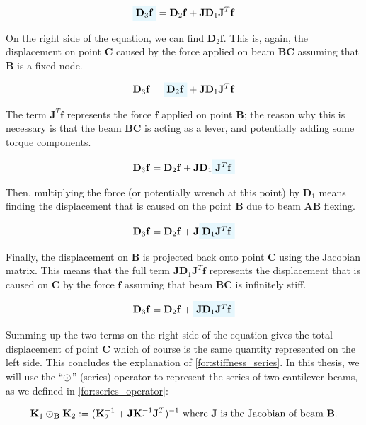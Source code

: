 $$
\colorbox{cyan!10}{$\mathbf{D}_3 \mathbf{f}$} = \mathbf{D}_2 \mathbf{f} + \mathbf{J} \mathbf{D}_1 \mathbf{J}^T \mathbf{f}
$$

\noindent
On the right side of the equation, we can find $\mathbf{D}_2 \mathbf{f}$. This is, again, the displacement 
on point $\mathbf{C}$ caused by the force applied on beam $\mathbf{BC}$ assuming that $\mathbf{B}$ is
a fixed node.

$$
\mathbf{D}_3 \mathbf{f} = \colorbox{cyan!10}{$\mathbf{D}_2 \mathbf{f}$} + \mathbf{J} \mathbf{D}_1 \mathbf{J}^T \mathbf{f}
$$

\noindent
The term $\mathbf{J}^T\mathbf{f}$ represents the force $\mathbf{f}$ applied on point $\mathbf{B}$; the reason why
this is necessary is that the beam $\mathbf{BC}$ is acting as a lever, and potentially adding some torque components.



$$
\mathbf{D}_3 \mathbf{f} = \mathbf{D}_2 \mathbf{f} + \mathbf{J} \mathbf{D}_1 \colorbox{cyan!10}{$\mathbf{J}^T \mathbf{f}$}
$$

\noindent
Then, multiplying the force (or potentially wrench at this point) by $\mathbf{D}_1$ means finding the displacement that
is caused on the point $\mathbf{B}$ due to beam $\mathbf{AB}$ flexing.

$$
\mathbf{D}_3 \mathbf{f} = \mathbf{D}_2 \mathbf{f} + \mathbf{J} \colorbox{cyan!10}{$\mathbf{D}_1 \mathbf{J}^T \mathbf{f}$}
$$

\noindent
Finally, the displacement on $\mathbf{B}$ is projected back onto point $\mathbf{C}$ using the Jacobian matrix.
This means that the full term $\mathbf{J} \mathbf{D}_1 \mathbf{J}^T \mathbf{f}$ represents
the displacement that is caused on $\mathbf{C}$ by the force $\mathbf{f}$ assuming that beam
$\mathbf{BC}$ is infinitely stiff.

$$
\mathbf{D}_3 \mathbf{f} = \mathbf{D}_2 \mathbf{f} + \colorbox{cyan!10}{$\mathbf{J} \mathbf{D}_1 \mathbf{J}^T \mathbf{f}$}
$$

\noindent
Summing up the two terms on the right side of the equation gives the total displacement of point $\mathbf{C}$
which of course is the same quantity represented on the left side. This concludes the explanation of \cref{for:stiffness_series}.
In this thesis, we will use the ``$\mathbin{\odot}$'' (series) operator to represent the series of two cantilever beams, as we defined
in \cref{for:series_operator}:


\begin{equation}
\mathbf{K}_1 \mathbin{\odot}_{\mathbf{B}} \mathbf{K}_2 := 
(\mathbf{K}_2^{-1} + \mathbf{J} \mathbf{K}_1^{-1} \mathbf{J}^T)^{-1} 
\text{ where $\mathbf{J}$ is the Jacobian of beam $\mathbf{B}$.}
\label{for:series_operator}
\end{equation}

